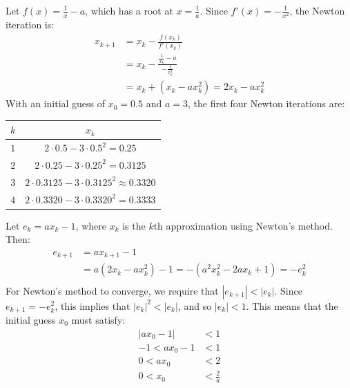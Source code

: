 \documentclass{article}
\begin{document}
\clearpage
\problem{}
Let $f(x) = \frac{1}{x} - a$, which has a root at $x = \frac{1}{a}$.
Since $f'(x) = - \frac{1}{x^2}$, the Newton iteration is:
\begin{align*}
    x_{k+1} & = x_k - \frac{f(x_k)}{f'(x_k)} \\
    & = x_k - \frac{\frac{1}{x_k} - a}{- \frac{1}{x_k^2}} \\
    & = x_k + (x_k - ax_k^2) = 2x_k - ax_k^2
\end{align*}
With an initial guess of $x_0 = 0.5$ and $a = 3$, the first four Newton iterations are:
\begin{center}
\begin{tabular}{|c|c|}
    \hline
    $k$ & $x_k$ \\
    \hline
    $1$ & $2 \cdot 0.5 - 3 \cdot 0.5^2 = 0.25$ \\
    \hline
    $2$ & $2 \cdot 0.25 - 3 \cdot 0.25^2 = 0.3125$ \\
    \hline
    $3$ & $2 \cdot 0.3125 - 3 \cdot 0.3125^2 \approx 0.3320$ \\
    \hline
    $4$ & $2 \cdot 0.3320 - 3 \cdot 0.3320^2 = 0.3333$ \\
    \hline
\end{tabular}
\end{center}
Let $e_k = ax_k - 1$, where $x_k$ is the $k$th approximation using Newton's method. Then:
\begin{align*}
    e_{k+1} & = ax_{k+1} - 1 \\
    & = a(2x_k - ax_k^2) - 1 = -(a^2x_k^2 - 2ax_k + 1) = -e_k^2\\
\end{align*}
For Newton's method to converge, we require that $|e_{k+1}| < |e_k|$. Since $e_{k+1} = -e_k^2$, this implies that $|e_k|^2 < |e_k|$, and so $|e_k| < 1$. This means that the initial guess $x_0$ must satisfy:
\begin{align*}
    |ax_0 - 1| & < 1 \\
    -1 < ax_0 - 1 & < 1 \\
    0 < ax_0 & < 2 \\
    0 < x_0 & < \frac{2}{a} \\
\end{align*}
\end{document}
